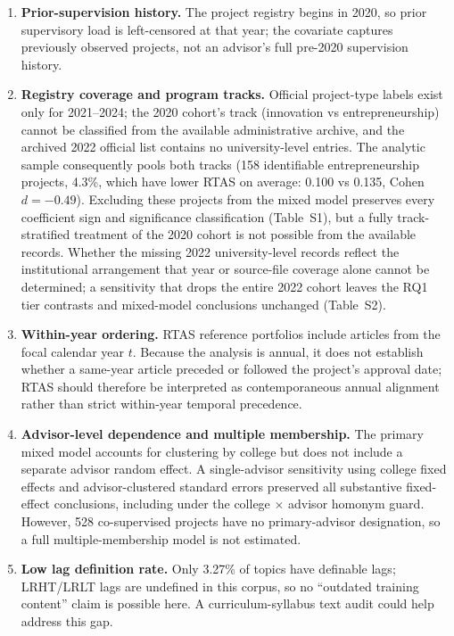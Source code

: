 \documentclass[11pt]{article}
\begin{document}
\begin{enumerate}
\item \textbf{Prior-supervision history.} The project registry begins in 2020, so prior supervisory load is left-censored at that year; the covariate captures previously observed projects, not an advisor's full pre-2020 supervision history.

\item \textbf{Registry coverage and program tracks.} Official project-type labels exist only for 2021--2024; the 2020 cohort's track (innovation vs entrepreneurship) cannot be classified from the available administrative archive, and the archived 2022 official list contains no university-level entries. The analytic sample consequently pools both tracks (158 identifiable entrepreneurship projects, 4.3\%, which have lower RTAS on average: 0.100 vs 0.135, Cohen $d=-0.49$). Excluding these projects from the mixed model preserves every coefficient sign and significance classification (Table~S1), but a fully track-stratified treatment of the 2020 cohort is not possible from the available records. Whether the missing 2022 university-level records reflect the institutional arrangement that year or source-file coverage alone cannot be determined; a sensitivity that drops the entire 2022 cohort leaves the RQ1 tier contrasts and mixed-model conclusions unchanged (Table~S2).

\item \textbf{Within-year ordering.} RTAS reference portfolios include articles from the focal calendar year $t$. Because the analysis is annual, it does not establish whether a same-year article preceded or followed the project's approval date; RTAS should therefore be interpreted as contemporaneous annual alignment rather than strict within-year temporal precedence.

\item \textbf{Advisor-level dependence and multiple membership.} The primary mixed model accounts for clustering by college but does not include a separate advisor random effect. A single-advisor sensitivity using college fixed effects and advisor-clustered standard errors preserved all substantive fixed-effect conclusions, including under the college $\times$ advisor homonym guard. However, 528 co-supervised projects have no primary-advisor designation, so a full multiple-membership model is not estimated.

\item \textbf{Low lag definition rate.} Only 3.27\% of topics have definable lags; LRHT/LRLT lags are undefined in this corpus, so no ``outdated training content'' claim is possible here. A curriculum-syllabus text audit could help address this gap.


\end{enumerate}
\end{document}
